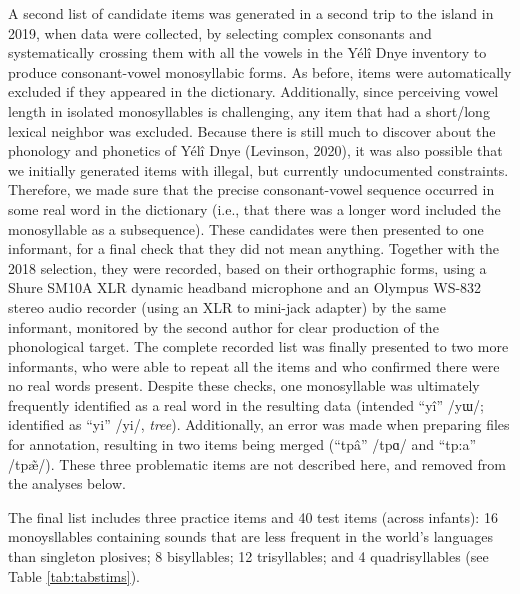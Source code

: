 \documentclass[english,,man,floatsintext]{apa6}
\begin{document}
A second list of candidate items was generated in a second trip to the island in 2019, when data were collected, by selecting complex consonants and systematically crossing them with all the vowels in the Yélî Dnye inventory to produce consonant-vowel monosyllabic forms. As before, items were automatically excluded if they appeared in the dictionary. Additionally, since perceiving vowel length in isolated monosyllables is challenging, any item that had a short/long lexical neighbor was excluded. Because there is still much to discover about the phonology and phonetics of Yélî Dnye (Levinson, 2020), it was also possible that we initially generated items with illegal, but currently undocumented constraints. Therefore, we made sure that the precise consonant-vowel sequence occurred in some real word in the dictionary (i.e., that there was a longer word included the monosyllable as a subsequence). These candidates were then presented to one informant, for a final check that they did not mean anything. Together with the 2018 selection, they were recorded, based on their orthographic forms, using a Shure SM10A XLR dynamic headband microphone and an Olympus WS-832 stereo audio recorder (using an XLR to mini-jack adapter) by the same informant, monitored by the second author for clear production of the phonological target. The complete recorded list was finally presented to two more informants, who were able to repeat all the items and who confirmed there were no real words present. Despite these checks, one monosyllable was ultimately frequently identified as a real word in the resulting data (intended \enquote{yî} /yɯ/; identified as \enquote{yi} /yi/, \emph{tree}). Additionally, an error was made when preparing files for annotation, resulting in two items being merged (\enquote{tpâ} /tpɑ/ and \enquote{tp:a} /tpæ̃/). These three problematic items are not described here, and removed from the analyses below.

The final list includes three practice items and 40 test items (across infants): 16 monoysllables containing sounds that are less frequent in the world's languages than singleton plosives; 8 bisyllables; 12 trisyllables; and 4 quadrisyllables (see Table \ref{tab:tabstims}).
\end{document}
